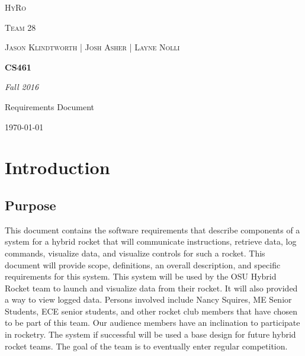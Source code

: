 \documentclass[10pt,draftclsnofoot,onecolumn,compsoc]{IEEEtran}
\begin{document}
\begin{titlepage}
	\centering
	{\scshape\LARGE HyRo \par}
	{\scshape\LARGE Team 28\par}
	\vspace{1cm}
	{\scshape\Large Jason Klindtworth  |  Josh Asher  |   Layne Nolli}
	\noindent\makebox[\linewidth]{\rule{17cm}{2pt}}
	\vspace{1cm}
	{\huge\bfseries CS461\par}
	\vspace{2cm}
	{\Large\itshape Fall 2016\par}
	\vspace{4cm}
	{\large Requirements Document\par}\vspace{8cm}
	\noindent\makebox[\linewidth]{\rule{17cm}{2pt}}
	\vfill

	{\large \today\par}
\end{titlepage}


\setcounter{tocdepth}{2}
\tableofcontents

\section{ Introduction}
\subsection{Purpose}
  This document contains the software requirements that describe components of a system for a hybrid rocket that will communicate instructions, retrieve data, log commands, visualize data, and visualize controls for such a rocket.  This document will provide scope, definitions, an overall description, and specific requirements for this system. This system will be used by the OSU Hybrid Rocket team to launch and visualize data from their rocket. It will also provided a way to view logged data. Persons involved include Nancy Squires, ME Senior Students, ECE senior students, and other rocket club members that have chosen to be part of this team. Our audience members have an inclination to participate in rocketry. The system if successful will be used a base design for future hybrid rocket teams. The goal of the team is to eventually enter regular competition.
\end{document}
